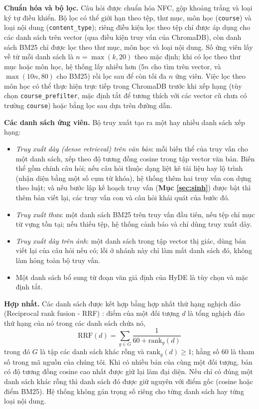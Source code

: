 \bigbreak\noindent
\textbf{Chuẩn hóa và bộ lọc.} Câu hỏi được chuẩn hóa NFC, gộp khoảng trắng và loại ký tự điều khiển. Bộ lọc có thể giới hạn theo tệp, thư mục, môn học (\texttt{course}) và loại nội dung (\texttt{content\_type}); riêng điều kiện lọc theo tệp chỉ được áp dụng cho các danh sách trên vector (qua điều kiện truy vấn của ChromaDB), còn danh sách BM25 chỉ được lọc theo thư mục, môn học và loại nội dung. Số ứng viên lấy về từ mỗi danh sách là $n=\max(k, 20)$ theo mặc định; khi có lọc theo thư mục hoặc môn học, hệ thống lấy nhiều hơn ($5n$ cho tìm trên vector, và $\max(10n, 80)$ cho BM25) rồi lọc sau để còn tối đa $n$ ứng viên. Việc lọc theo môn học có thể thực hiện trực tiếp trong ChromaDB trước khi xếp hạng (tùy chọn \texttt{course\_prefilter}, mặc định tắt để tương thích với các vector cũ chưa có trường \texttt{course}) hoặc bằng lọc sau dựa trên đường dẫn.

\bigbreak\noindent
\textbf{Các danh sách ứng viên.} Bộ truy xuất tạo ra một hay nhiều danh sách xếp hạng:
\begin{itemize}
    \item \emph{Truy xuất dày (dense retrieval) trên văn bản}: mỗi biến thể của truy vấn cho một danh sách, xếp theo độ tương đồng cosine trong tập vector văn bản. Biến thể gồm chính câu hỏi; nếu câu hỏi thuộc dạng liệt kê tài liệu hay lộ trình (nhận diện bằng một số cụm từ khóa), hệ thống thêm hai truy vấn con dựng theo luật; và nếu bước lập kế hoạch truy vấn (\textbf{Mục \ref{sec:sinh}}) được bật thì thêm bản viết lại, các truy vấn con và câu hỏi khái quát của bước đó.
    \item \emph{Truy xuất thưa}: một danh sách BM25 trên truy vấn đầu tiên, nếu tệp chỉ mục từ vựng tồn tại; nếu thiếu tệp, hệ thống cảnh báo và chỉ dùng truy xuất dày.
    \item \emph{Truy xuất dày trên ảnh}: một danh sách trong tập vector thị giác, dùng bản viết lại của câu hỏi nếu có; lỗi ở nhánh này chỉ làm mất danh sách đó, không làm hỏng toàn bộ truy vấn.
    \item Một danh sách bổ sung từ đoạn văn giả định của HyDE \cite{gao2023hyde} là tùy chọn và mặc định tắt.
\end{itemize}

\bigbreak\noindent
\textbf{Hợp nhất.} Các danh sách được kết hợp bằng hợp nhất thứ hạng nghịch đảo (Reciprocal rank fusion - RRF) \cite{cormack2009rrf}: điểm của một đối tượng $d$ là tổng nghịch đảo thứ hạng của nó trong các danh sách chứa nó,
\begin{equation}\label{eq:rrf}
    \mathrm{RRF}(d) = \sum_{g \in G} \frac{1}{60 + \mathrm{rank}_g(d)}
\end{equation}
trong đó $G$ là tập các danh sách khác rỗng và $\mathrm{rank}_g(d)\ge 1$; hằng số 60 là tham số trong mã nguồn của chúng tôi. Khi có nhiều bản của cùng một đối tượng, bản có độ tương đồng cosine cao nhất được giữ lại làm đại diện. Nếu chỉ có đúng một danh sách khác rỗng thì danh sách đó được giữ nguyên với điểm gốc (cosine hoặc điểm BM25). Hệ thống không gán trọng số riêng cho từng danh sách hay từng loại nội dung.


